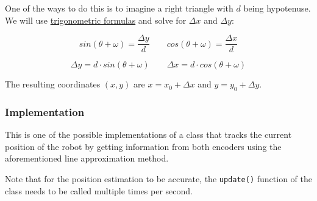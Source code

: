 \documentclass[12pt,twoside]{article}
\begin{document}
One of the ways to do this is to imagine a right triangle with $d$ being hypotenuse. We will use \href{https://www2.clarku.edu/faculty/djoyce/trig/formulas.html}{trigonometric formulas} and solve for $\Delta x$ and $\Delta y$:

\vspace{-\parskip}\[sin(\theta + \omega)=\frac{\Delta y}{d} \qquad cos(\theta + \omega)=\frac{\Delta x}{d}\]

\vspace{-\parskip}\[\Delta y = d \cdot sin(\theta + \omega) \qquad \Delta x = d \cdot cos(\theta + \omega)\]

The resulting coordinates $(x,y)$ are $x=x_0+\Delta x$ and $y=y_0+\Delta y$.


\subsubsection{Implementation}
This is one of the possible implementations of a class that tracks the current position of the robot by getting information from both encoders using the aforementioned line approximation method.

Note that for the position estimation to be accurate, the \texttt{update()} function of the class needs to be called multiple times per second.
\end{document}
